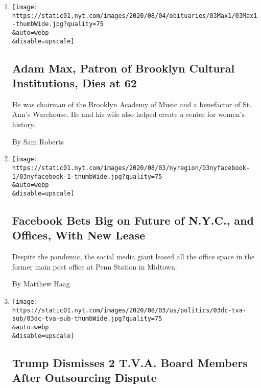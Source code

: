 \begin{enumerate}
\def\labelenumi{\arabic{enumi}.}
\item
  \href{/2020/08/03/arts/adam-max-patron-of-brooklyn-cultural-institutions-dies-at-62.html}{}

  \texttt{[image: https://static01.nyt.com/images/2020/08/04/obituaries/03Max1/03Max1-thumbWide.jpg?quality=75\\\&auto=webp\\\&disable=upscale]}

  \hypertarget{adam-max-patron-of-brooklyn-cultural-institutions-dies-at-62}{%
  \subsection{Adam Max, Patron of Brooklyn Cultural Institutions, Dies
  at
  62}\label{adam-max-patron-of-brooklyn-cultural-institutions-dies-at-62}}

  He was chairman of the Brooklyn Academy of Music and a benefactor of
  St. Ann's Warehouse. He and his wife also helped create a center for
  women's history.

  By Sam Roberts
\item
  \href{/2020/08/03/nyregion/facebook-nyc-office-farley-building.html}{}

  \texttt{[image: https://static01.nyt.com/images/2020/08/03/nyregion/03nyfacebook-1/03nyfacebook-1-thumbWide.jpg?quality=75\\\&auto=webp\\\&disable=upscale]}

  \hypertarget{facebook-bets-big-on-future-of-nyc-and-offices-with-new-lease}{%
  \subsection{Facebook Bets Big on Future of N.Y.C., and Offices, With
  New
  Lease}\label{facebook-bets-big-on-future-of-nyc-and-offices-with-new-lease}}

  Despite the pandemic, the social media giant leased all the office
  space in the former main post office at Penn Station in Midtown.

  By Matthew Haag
\item
  \href{/2020/08/03/us/politics/trump-tennessee-valley-authority.html}{}

  \texttt{[image: https://static01.nyt.com/images/2020/08/03/us/politics/03dc-tva-sub/03dc-tva-sub-thumbWide.jpg?quality=75\\\&auto=webp\\\&disable=upscale]}

  \hypertarget{trump-dismisses-2-tva-board-members-after-outsourcing-dispute}{%
  \subsection{Trump Dismisses 2 T.V.A. Board Members After Outsourcing
  Dispute}\label{trump-dismisses-2-tva-board-members-after-outsourcing-dispute}}


\end{enumerate}
